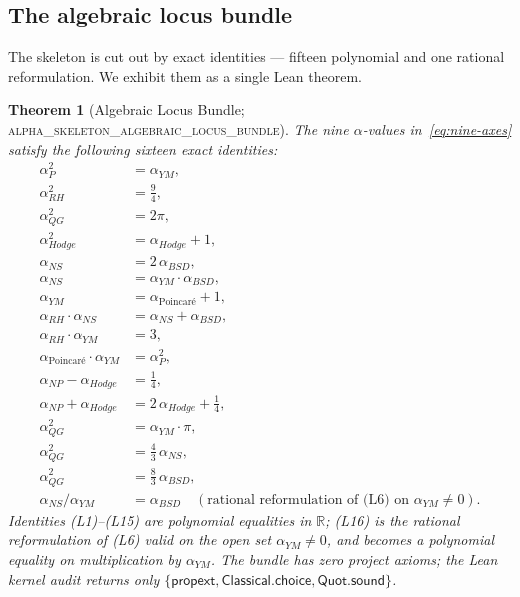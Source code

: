 \documentclass[11pt,a4paper]{amsart}
\theoremstyle{plain}
\newtheorem{theorem}{Theorem}[section]
\theoremstyle{definition}
\newcommand{\Rl}{\mathbb{R}}
\newcommand{\aP}{\alpha_{P}}
\newcommand{\aNP}{\alpha_{NP}}
\newcommand{\aRH}{\alpha_{RH}}
\newcommand{\aYM}{\alpha_{YM}}
\newcommand{\aNS}{\alpha_{NS}}
\newcommand{\aBSD}{\alpha_{BSD}}
\newcommand{\aHodge}{\alpha_{Hodge}}
\newcommand{\aPoinc}{\alpha_{\text{Poincar\'e}}}
\newcommand{\aQG}{\alpha_{QG}}
\newcommand{\LeanThm}[1]{\textsc{#1}}
\begin{document}
\subsection{The algebraic locus bundle}
\label{subsec:locus}
The skeleton is cut out by exact identities --- fifteen polynomial and one
rational reformulation. We exhibit them as
a single Lean theorem.
\begin{theorem}[Algebraic Locus Bundle; \LeanThm{alpha\_skeleton\_algebraic\_locus\_bundle}]
\label{thm:locus}
The nine $\alpha$-values in~\eqref{eq:nine-axes} satisfy the following
sixteen exact identities:
\begin{align}
\aP^2 &= \aYM,                                          \tag{L1} \\
\aRH^2 &= \tfrac{9}{4},                                 \tag{L2} \\
\aQG^2 &= 2\pi,                                         \tag{L3} \\
\aHodge^2 &= \aHodge + 1,                               \tag{L4} \\
\aNS &= 2\,\aBSD,                                       \tag{L5} \\
\aNS &= \aYM \cdot \aBSD,                               \tag{L6} \\
\aYM &= \aPoinc + 1,                                    \tag{L7} \\
\aRH \cdot \aNS &= \aNS + \aBSD,                        \tag{L8} \\
\aRH \cdot \aYM &= 3,                                   \tag{L9} \\
\aPoinc \cdot \aYM &= \aP^2,                            \tag{L10} \\
\aNP - \aHodge &= \tfrac{1}{4},                         \tag{L11} \\
\aNP + \aHodge &= 2\,\aHodge + \tfrac{1}{4},            \tag{L12} \\
\aQG^2 &= \aYM \cdot \pi,                               \tag{L13} \\
\aQG^2 &= \tfrac{4}{3}\,\aNS,                           \tag{L14} \\
\aQG^2 &= \tfrac{8}{3}\,\aBSD,                          \tag{L15} \\
\aNS / \aYM &= \aBSD \quad (\text{rational reformulation of (L6) on } \aYM \neq 0). \tag{L16}
\end{align}
Identities (L1)--(L15) are polynomial equalities in $\Rl$; (L16) is the
rational reformulation of (L6) valid on the open set $\aYM \neq 0$, and
becomes a polynomial equality on multiplication by $\aYM$. The bundle has
zero project axioms; the Lean kernel audit returns only $\{\mathsf{propext},
\mathsf{Classical.choice}, \mathsf{Quot.sound}\}$.
\end{theorem}
\end{document}
